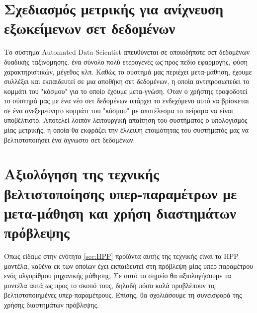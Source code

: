 \section{Σχεδιασμός μετρικής για ανίχνευση εξωκείμενων σετ δεδομένων}
Το σύστημα Automated Data Scientist απευθύνεται σε οποιοδήποτε σετ δεδομένων δυαδικής ταξινόμησης. ένα σύνολο πολύ ετερογενές ως προς πεδίο εφαρμογής, φύση χαρακτηριστικών, μέγεθος κλπ. Καθώς το σύστημά μας περιέχει μετα-μάθηση, έχουμε συλλέξει και εκπαιδευτεί σε μια αποθήκη σετ δεδομένων, η οποία αντιπροσωπεύει το κομμάτι του "κόσμου" για το οποίο έχουμε μετα-γνώση. Όταν ο χρήστης τροφοδοτεί το σύστημά μας με ένα νέο σετ δεδομένων υπάρχει το ενδεχόμενο αυτό να βρίσκεται σε ένα ανεξερεύνητο κομμάτι του "κόσμου" με αποτέλεσμα το πείραμα να είναι υποβέλτιστο. Αποτελεί λοιπόν λειτουργική απαίτηση του συστήματος ο υπολογισμός μίας μετρικής, η οποία θα εκφράζει την έλλειψη ετοιμότητας του συστήματός μας να βελτιστοποιήσει ένα άγνωστο σετ δεδομένων.


\section{Αξιολόγηση της τεχνικής βελτιστοποίησης υπερ-παραμέτρων με μετα-μάθηση και χρήση διαστημάτων πρόβλεψης}
Όπως είδαμε στην ενότητα \ref{sec:HPP} προϊόντα αυτής της τεχνικής είναι τα \gls{HPP} μοντέλα, καθένα εκ των οποίων έχει εκπαιδευτεί στη πρόβλεψη μίας υπερ-παραμέτρου ενός αλγορίθμου μηχανικής μάθησης. Σε αυτό το σημείο θα αξιολογήσουμε τα μοντέλα αυτά ως προς το σκοπό τους, δηλαδή πόσο καλά προβλέπουν τις βελτιστοποιημένες υπερ-παραμέτρους. Επίσης, θα σχολιάσουμε τη συνεισφορά της χρήσης διαστημάτων πρόβλεψης.

